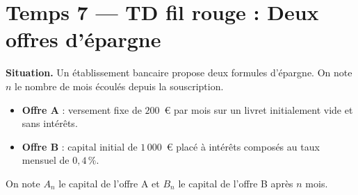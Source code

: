 
\section*{Temps 7 — TD fil rouge : Deux offres d'épargne}

\textbf{Situation.} Un établissement bancaire propose deux formules d'épargne. On note $n$ le nombre de mois écoulés depuis la souscription.

\begin{itemize}
  \item \textbf{Offre A} : versement fixe de $200$~€ par mois sur un livret initialement vide et sans intérêts.
  \item \textbf{Offre B} : capital initial de $1\,000$~€ placé à intérêts composés au taux mensuel de $0{,}4\,\%$.
\end{itemize}

On note $A_n$ le capital de l'offre A et $B_n$ le capital de l'offre B après $n$ mois.

\bigskip


